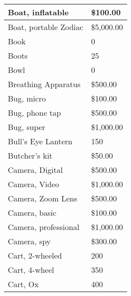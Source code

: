 \documentclass[twoside]{book}
\begin{document}
\begin{longtable}{p{1.25in}l}
  \raggedright
           Boat, inflatable 
  &
   \$100.00 
  \tabularnewline
  \hline
      
  \raggedright
           Boat, portable Zodiac 
  &
   \$5,000.00 
  \tabularnewline
  \hline
      
  \raggedright
           Book 
  &
   0 
  \tabularnewline
  \hline
      
  \raggedright
           Boots 
  &
   25 
  \tabularnewline
  \hline
      
  \raggedright
           Bowl 
  &
   0 
  \tabularnewline
  \hline
      
  \raggedright
           Breathing Apparatus 
  &
   \$500.00 
  \tabularnewline
  \hline
      
  \raggedright
           Bug, micro 
  &
   \$100.00 
  \tabularnewline
  \hline
      
  \raggedright
           Bug, phone tap 
  &
   \$500.00 
  \tabularnewline
  \hline
      
  \raggedright
           Bug, super 
  &
   \$1,000.00 
  \tabularnewline
  \hline
      
  \raggedright
           Bull's Eye Lantern
           
  &
   150 
  \tabularnewline
  \hline
      
  \raggedright
           Butcher's kit 
  &
   \$50.00 
  \tabularnewline
  \hline
      
  \raggedright
           Camera, Digital 
  &
   \$500.00 
  \tabularnewline
  \hline
      
  \raggedright
           Camera, Video 
  &
   \$1,000.00 
  \tabularnewline
  \hline
      
  \raggedright
           Camera, Zoom Lens 
  &
   \$500.00 
  \tabularnewline
  \hline
      
  \raggedright
           Camera, basic 
  &
   \$100.00 
  \tabularnewline
  \hline
      
  \raggedright
           Camera, professional 
  &
   \$1,000.00 
  \tabularnewline
  \hline
      
  \raggedright
           Camera, spy 
  &
   \$300.00 
  \tabularnewline
  \hline
      
  \raggedright
           Cart, 2-wheeled 
  &
   200 
  \tabularnewline
  \hline
      
  \raggedright
           Cart, 4-wheel 
  &
   350 
  \tabularnewline
  \hline
      
  \raggedright
           Cart, Ox 
  &
   400 
  \tabularnewline
  \hline
      

\end{longtable}
\end{document}

